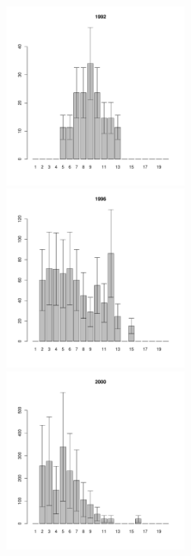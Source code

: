\begin{figure}[h]

\begin{multicols}{3}
\hfill
\includegraphics[width=60mm]{../White_Sea/Luvenga_II_razrez/high_beatch_1992_.pdf}
\hfill
\includegraphics[width=60mm]{../White_Sea/Luvenga_II_razrez/high_beatch_1996_.pdf}
\hfill
\includegraphics[width=60mm]{../White_Sea/Luvenga_II_razrez/high_beatch_2000_.pdf}
\end{multicols}




\end{figure}
